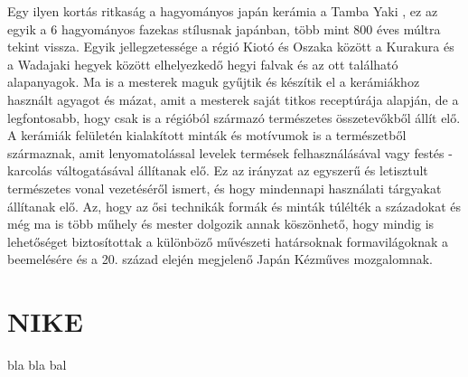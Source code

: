 \vspace{2 mm}
Egy ilyen kortás ritkaság a hagyományos japán kerámia a Tamba Yaki \cite{tambayaki}, ez az egyik a 6 hagyományos fazekas stílusnak japánban, több mint 800 éves múltra tekint vissza. Egyik jellegzetessége a régió Kiotó és Oszaka között a Kurakura és a Wadajaki hegyek között elhelyezkedő hegyi falvak és az ott található alapanyagok. Ma is a mesterek maguk gyűjtik és készítik el a kerámiákhoz használt agyagot és mázat, amit a mesterek saját titkos receptúrája alapján, de a legfontosabb, hogy csak is a régióból származó természetes összetevőkből állít elő. A kerámiák felületén kialakított minták és motívumok is a természetből származnak, amit lenyomatolással levelek termések felhasználásával vagy festés - karcolás váltogatásával állítanak elő. Ez az irányzat az egyszerű és letisztult természetes vonal vezetéséről ismert, és hogy mindennapi használati tárgyakat állítanak elő. Az, hogy az ősi technikák formák és minták túlélték  a századokat és még ma is több műhely és mester dolgozik annak köszönhető, hogy mindig is lehetőséget biztosítottak a különböző művészeti határsoknak formavilágoknak a beemelésére és a 20. század elején megjelenő Japán Kézműves mozgalomnak.

\section{NIKE}

bla bla bal




